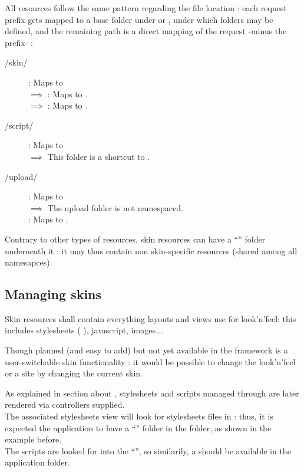 \documentclass[pdftex,12pt,a4paper]{article}
\begin{document}
All resources follow the same pattern regarding the file location : each request prefix gets mapped to a base folder under  or , under which  folders may be defined, and the remaining path is a direct mapping of the request -minus the prefix- :
\begin{description}
	\item[/skin/] : Maps to  \\
	$\implies$  : Maps to .\\
	$\implies$  : Maps to .
	\item[/script/] : Maps to  \\
	$\implies$ This folder is a shortcut to .
	\item[/upload/] : Maps to  \\
	$\implies$ The upload folder is not namespaced.\\
	\eg {} : Maps to .
\end{description}

\begin{note}
Contrary to other types of resources, skin resources can have a ``''  folder underneath it : it may thus contain non skin-specific resources (\ie shared among all namesapces).
\end{note}

\subsection{Managing skins} \label{sec:managing-skins}

Skin resources shall contain everything layouts and views use for look'n'feel: this includes stylesheets (  ), javascript, images\ldots.
\begin{note}
Though planned (and easy to add) but not yet available in the framework is a user-switchable skin functionality : it would be possible to change the look'n'feel or a site by changing the current skin.
\end{note}
\begin{note}
As explained in section about , stylesheets and scripts managed through  are later rendered via controllers supplied.\\
The associated stylesheets view will look for stylesheets files in  : thus, it is expected the application to have a ``'' folder in the  folder, as shown in the example before.\\
The scripts are looked for into the ``'', so similarily, a  should be available in the application  folder.
\end{note}
\end{document}

